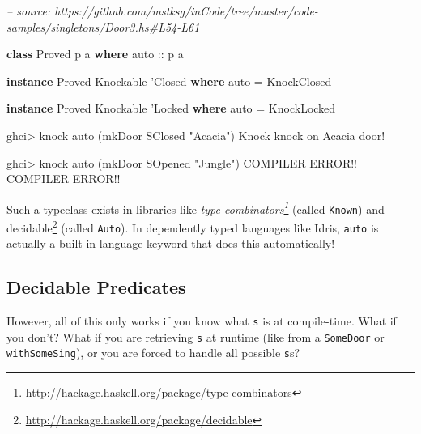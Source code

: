 \documentclass[]{article}
\newenvironment{Shaded}{}{}
\newcommand{\CommentTok}[1]{\textcolor[rgb]{0.38,0.63,0.69}{\textit{#1}}}
\newcommand{\DataTypeTok}[1]{\textcolor[rgb]{0.56,0.13,0.00}{#1}}
\newcommand{\FunctionTok}[1]{\textcolor[rgb]{0.02,0.16,0.49}{#1}}
\newcommand{\KeywordTok}[1]{\textcolor[rgb]{0.00,0.44,0.13}{\textbf{#1}}}
\newcommand{\NormalTok}[1]{#1}
\newcommand{\OtherTok}[1]{\textcolor[rgb]{0.00,0.44,0.13}{#1}}
\newcommand{\StringTok}[1]{\textcolor[rgb]{0.25,0.44,0.63}{#1}}
\renewcommand{\href}[2]{#2\footnote{\url{#1}}}
\begin{document}
\begin{Shaded}
\begin{Highlighting}[]
\CommentTok{-- source: https://github.com/mstksg/inCode/tree/master/code-samples/singletons/Door3.hs#L54-L61}

\KeywordTok{class} \DataTypeTok{Proved}\NormalTok{ p a }\KeywordTok{where}
\OtherTok{    auto ::}\NormalTok{ p a}

\KeywordTok{instance} \DataTypeTok{Proved} \DataTypeTok{Knockable}\NormalTok{ '}\DataTypeTok{Closed} \KeywordTok{where}
\NormalTok{    auto }\FunctionTok{=} \DataTypeTok{KnockClosed}

\KeywordTok{instance} \DataTypeTok{Proved} \DataTypeTok{Knockable}\NormalTok{ '}\DataTypeTok{Locked} \KeywordTok{where}
\NormalTok{    auto }\FunctionTok{=} \DataTypeTok{KnockLocked}
\end{Highlighting}
\end{Shaded}

\begin{Shaded}
\begin{Highlighting}[]
\NormalTok{ghci}\FunctionTok{>}\NormalTok{ knock auto (mkDoor }\DataTypeTok{SClosed} \StringTok{"Acacia"}\NormalTok{)}
\DataTypeTok{Knock}\NormalTok{ knock on }\DataTypeTok{Acacia}\NormalTok{ door}\FunctionTok{!}

\NormalTok{ghci}\FunctionTok{>}\NormalTok{ knock auto (mkDoor }\DataTypeTok{SOpened} \StringTok{"Jungle"}\NormalTok{)}
\DataTypeTok{COMPILER} \DataTypeTok{ERROR}\FunctionTok{!!} \DataTypeTok{COMPILER} \DataTypeTok{ERROR}\FunctionTok{!!}
\end{Highlighting}
\end{Shaded}

Such a typeclass exists in libraries like
\emph{\href{http://hackage.haskell.org/package/type-combinators}{type-combinators}}
(called \texttt{Known}) and
\href{http://hackage.haskell.org/package/decidable}{decidable} (called
\texttt{Auto}). In dependently typed languages like Idris, \texttt{auto} is
actually a built-in language keyword that does this automatically!

\hypertarget{decidable-predicates}{%
\subsection{Decidable Predicates}\label{decidable-predicates}}

However, all of this only works if you know what \texttt{s} is at compile-time.
What if you don't? What if you are retrieving \texttt{s} at runtime (like from a
\texttt{SomeDoor} or \texttt{withSomeSing}), or you are forced to handle all
possible \texttt{s}s?
\end{document}
